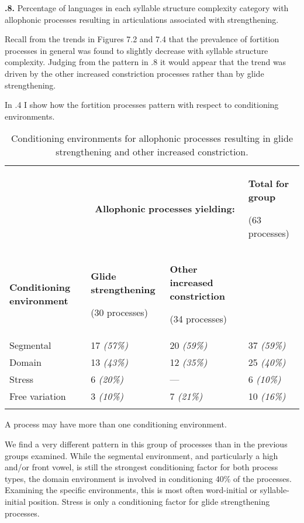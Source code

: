 \textbf{.8.} Percentage of languages in each syllable structure complexity category with allophonic processes resulting in articulations associated with strengthening.



  Recall from the trends in Figures 7.2 and 7.4 that the prevalence of fortition processes in general was found to slightly decrease with syllable structure complexity. Judging from the pattern in .8 it would appear that the trend was driven by the other increased constriction processes rather than by glide strengthening.



  In .4 I show how the fortition processes pattern with respect to conditioning environments.






\begin{table}
\begin{tabularx}{\textwidth}{XXXX}
\lsptoprule
 & \multicolumn{2}{c}{ \textbf{Allophonic} \textbf{processes} \textbf{yielding:}} & { \textbf{Total} \textbf{for} \textbf{group}}

 (63 processes)\\
 \textbf{Conditioning} \textbf{environment} & { \textbf{Glide} \textbf{strengthening}}

 (30 processes) & { \textbf{Other} \textbf{increased} \textbf{constriction}}

 (34 processes) & \\
 Segmental & 17 \textit{(57\%)} & 20 \textit{(59\%)} & 37 \textit{(59\%)}\\
 Domain & 13 \textit{(43\%)} & 12 \textit{(35\%)} & 25 \textit{(40\%)}\\
 Stress & 6 \textit{(20\%)} & — & 6 \textit{(10\%)}\\
 Free variation & 3 \textit{(10\%)} & 7 \textit{(21\%)} & 10 \textit{(16\%)}\\
\lspbottomrule
\end{tabularx}
\caption{\label{7.4}Conditioning environments for allophonic processes resulting in glide strengthening and other increased constriction.}A process may have more than one conditioning environment.
\end{table}




  We find a very different pattern in this group of processes than in the previous groups examined. While the segmental environment, and particularly a high and/or front vowel, is still the strongest conditioning factor for both process types, the domain environment is involved in conditioning 40\% of the processes. Examining the specific environments, this is most often word-initial or syllable-initial position. Stress is only a conditioning factor for glide strengthening processes.



